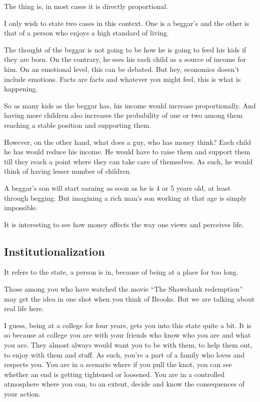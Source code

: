 \documentclass[twoside,11pt]{article}
\begin{document}
The thing is, in most cases it is directly proportional.

I only wish to state two cases in this context. One is a beggar's and the other is that of a person who enjoys a high standard of living.

The thought of the beggar is not going to be how he is going to feed his kids if they are born. On the contrary, he sees his each child as a source of income for him. On an emotional level, this can be debated. But hey, economics doesn't include emotions. Facts are facts and whatever you might feel, this is what is happening.

So as many kids as the beggar has, his income would increase proportionally. And having more children also increases the probability of one or two among them reaching a stable position and supporting them.

However, on the other hand, what does a guy, who has money think? Each child he has would reduce his income. He would have to raise them and support them till they reach a point where they can take care of themselves. As such, he would think of having lesser number of children.

A beggar's son will start earning as soon as he is 4 or 5 years old, at least through begging. But imagining a rich man's son working at that age is simply impossible.

It is interesting to see how money affects the way one views and perceives life.

\newpage
\begin{center}
  \section{Institutionalization}
\end{center}
\bigskip
\bigskip
\bigskip

It refers to the state, a person is in, because of being at a place for too long.

Those among you who have watched the movie ``The Shawshank redemption'' may get the idea in one shot when you think of Brooks. But we are talking about real life here.

I guess, being at a college for four years, gets you into this state quite a bit. It is so because at college you are with your friends who know who you are and what you are. They almost always would want you to be with them, to help them out, to enjoy with them and stuff. As such, you're a part of a family who loves and respects you. You are in a scenario where if you pull the knot, you can see whether an end is getting tightened or loosened. You are in a controlled atmosphere where you can, to an extent, decide and know the consequences of your action.
\end{document}
